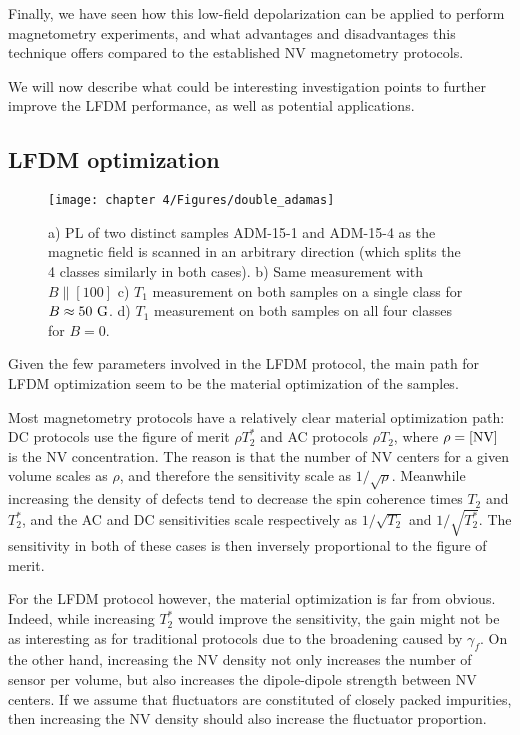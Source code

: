 \documentclass[a4paper, 11pt]{book}
\begin{document}
Finally, we have seen how this low-field depolarization can be applied to perform magnetometry experiments, and what advantages and disadvantages this technique offers compared to the established NV magnetometry protocols.

We will now describe what could be interesting investigation points to further improve the LFDM performance, as well as potential applications.

\subsection{LFDM optimization}
\begin{figure}[h!]
\centering
\texttt{[image: chapter 4/Figures/double\_adamas]}
\caption{a) PL of two distinct samples ADM-15-1 and ADM-15-4 as the magnetic field is scanned in an arbitrary direction (which splits the 4 classes similarly in both cases). b) Same measurement with $B\parallel [100]$ c) $T_1$ measurement on both samples on a single class for $B\approx 50\ \rm G$. d) $T_1$ measurement on both samples on all four classes for $B=0$.}
\label{double dragon}
\end{figure}


Given the few parameters involved in the LFDM protocol, the main path for LFDM optimization seem to be the material optimization of the samples.

Most magnetometry protocols have a relatively clear material optimization path: DC protocols use the figure of merit $\rho T_2^*$ and AC protocols $\rho T_2$, where $\rho=[\rm NV]$ is the NV concentration. The reason is that the number of NV centers for a given volume scales as $\rho$, and therefore the sensitivity scale as $1/\sqrt{\rho}$. Meanwhile increasing the density of defects tend to decrease the spin coherence times $T_2$ and $T_2^*$, and the AC and DC sensitivities scale respectively as $1/\sqrt{T_2}$ and $1/\sqrt{T_2^*}$. The sensitivity in both of these cases is then inversely proportional to the figure of merit.

For the LFDM protocol however, the material optimization is far from obvious. Indeed, while increasing $T_2^*$ would improve the sensitivity, the gain might not be as interesting as for traditional protocols due to the broadening caused by $\gamma_f$. On the other hand, increasing the NV density not only increases the number of sensor per volume, but also increases the dipole-dipole strength between NV centers. If we assume that fluctuators are constituted of closely packed impurities, then increasing the NV density should also increase the fluctuator proportion.
\end{document}
